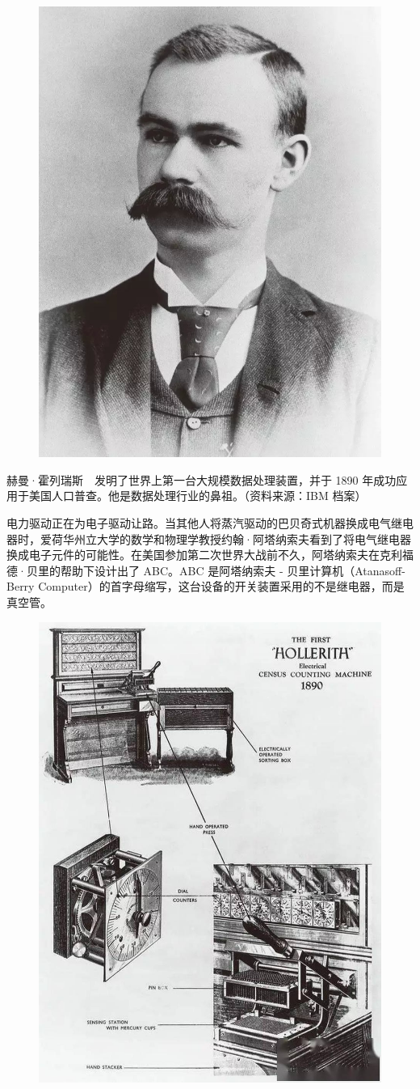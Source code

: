 \documentclass[12pt,UTF8]{ctexbook}
\begin{document}
\begin{figure}[htbp]
	\centering
	\includegraphics[width=0.7\linewidth]{3}
	\caption{}
	\label{fig:1}
\end{figure}

赫曼·霍列瑞斯　发明了世界上第一台大规模数据处理装置，并于 1890 年成功应用于美国人口普查。他是数据处理行业的鼻祖。（资料来源：IBM 档案）

电力驱动正在为电子驱动让路。当其他人将蒸汽驱动的巴贝奇式机器换成电气继电器时，爱荷华州立大学的数学和物理学教授约翰·阿塔纳索夫看到了将电气继电器换成电子元件的可能性。在美国参加第二次世界大战前不久，阿塔纳索夫在克利福德·贝里的帮助下设计出了 ABC。ABC 是阿塔纳索夫 - 贝里计算机（Atanasoff-Berry Computer）的首字母缩写，这台设备的开关装置采用的不是继电器，而是真空管。

\begin{figure}[htbp]
	\centering
	\includegraphics[width=0.7\linewidth]{4}
	\caption{}
	\label{fig:1}
\end{figure}
\end{document}
